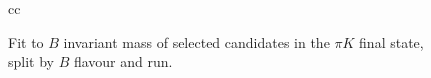 \begin{figure}[h]
\begin{tabular}{cc}
         \\
    \end{tabular}
    \caption{Fit to $B$ invariant mass of selected candidates in the $\pi K$ final state, split by $B$ flavour and run.}
\label{fig:data_fit_piK}
\end{figure}

